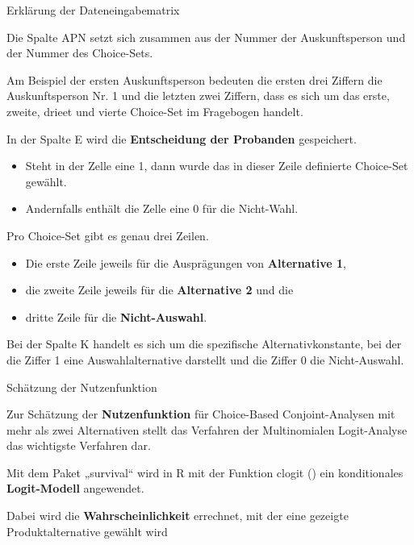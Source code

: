 \documentclass[12pt,ngerman,a4paper,ignorenonframetext,]{beamer}
\providecommand{\tightlist}{%
  \setlength{\itemsep}{0pt}\setlength{\parskip}{0pt}}
\begin{document}
\begin{frame}{Erklärung der Dateneingabematrix}
\protect\hypertarget{erklarung-der-dateneingabematrix}{}

Die Spalte APN setzt sich zusammen aus der Nummer der Auskunftsperson
und der Nummer des Choice-Sets.

Am Beispiel der ersten Auskunftsperson bedeuten die ersten drei Ziffern
die Auskunftsperson Nr. 1 und die letzten zwei Ziffern, dass es sich um
das erste, zweite, drieet und vierte Choice-Set im Fragebogen handelt.

In der Spalte E wird die \textbf{Entscheidung der Probanden}
gespeichert.

\begin{itemize}
\tightlist
\item
  Steht in der Zelle eine 1, dann wurde das in dieser Zeile definierte
  Choice-Set gewählt.
\item
  Andernfalls enthält die Zelle eine 0 für die Nicht-Wahl.
\end{itemize}

Pro Choice-Set gibt es genau drei Zeilen.

\begin{itemize}
\tightlist
\item
  Die erste Zeile jeweils für die Ausprägungen von \textbf{Alternative
  1},
\item
  die zweite Zeile jeweils für die \textbf{Alternative 2} und die
\item
  dritte Zeile für die \textbf{Nicht-Auswahl}.
\end{itemize}

Bei der Spalte K handelt es sich um die spezifische Alternativkonstante,
bei der die Ziffer 1 eine Auswahlalternative darstellt und die Ziffer 0
die Nicht-Auswahl.

\end{frame}

\begin{frame}{Schätzung der Nutzenfunktion}
\protect\hypertarget{schatzung-der-nutzenfunktion}{}

Zur Schätzung der \textbf{Nutzenfunktion} für Choice-Based
Conjoint-Analysen mit mehr als zwei Alternativen stellt das Verfahren
der Multinomialen Logit-Analyse das wichtigste Verfahren dar.

Mit dem Paket „survival`` wird in R mit der Funktion clogit () ein
konditionales \textbf{Logit-Modell} angewendet.

Dabei wird die \textbf{Wahrscheinlichkeit} errechnet, mit der eine
gezeigte Produktalternative gewählt wird

\end{frame}
\end{document}

